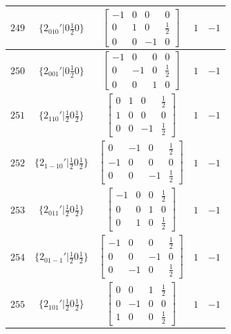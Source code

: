 \documentclass[fleqn,8pt]{jsarticle}
\begin{document}
\begin{longtable}{ccccc}
$ 249 $ & $ \{2{}_{010}{}'|0 \frac{1}{2} 0\} $ & $ \begin{bmatrix} -1 & 0 & 0 & 0 \\ 0 & 1 & 0 & \frac{1}{2} \\ 0 & 0 & -1 & 0 \end{bmatrix} $ & $ 1 $ & $ -1 $ \\ \hline
$ 250 $ & $ \{2{}_{001}{}'|0 \frac{1}{2} 0\} $ & $ \begin{bmatrix} -1 & 0 & 0 & 0 \\ 0 & -1 & 0 & \frac{1}{2} \\ 0 & 0 & 1 & 0 \end{bmatrix} $ & $ 1 $ & $ -1 $ \\ \hline
$ 251 $ & $ \{2{}_{110}{}'|\frac{1}{2} 0 \frac{1}{2}\} $ & $ \begin{bmatrix} 0 & 1 & 0 & \frac{1}{2} \\ 1 & 0 & 0 & 0 \\ 0 & 0 & -1 & \frac{1}{2} \end{bmatrix} $ & $ 1 $ & $ -1 $ \\ \hline
$ 252 $ & $ \{2{}_{1-10}{}'|\frac{1}{2} 0 \frac{1}{2}\} $ & $ \begin{bmatrix} 0 & -1 & 0 & \frac{1}{2} \\ -1 & 0 & 0 & 0 \\ 0 & 0 & -1 & \frac{1}{2} \end{bmatrix} $ & $ 1 $ & $ -1 $ \\ \hline
$ 253 $ & $ \{2{}_{011}{}'|\frac{1}{2} 0 \frac{1}{2}\} $ & $ \begin{bmatrix} -1 & 0 & 0 & \frac{1}{2} \\ 0 & 0 & 1 & 0 \\ 0 & 1 & 0 & \frac{1}{2} \end{bmatrix} $ & $ 1 $ & $ -1 $ \\ \hline
$ 254 $ & $ \{2{}_{01-1}{}'|\frac{1}{2} 0 \frac{1}{2}\} $ & $ \begin{bmatrix} -1 & 0 & 0 & \frac{1}{2} \\ 0 & 0 & -1 & 0 \\ 0 & -1 & 0 & \frac{1}{2} \end{bmatrix} $ & $ 1 $ & $ -1 $ \\ \hline
$ 255 $ & $ \{2{}_{101}{}'|\frac{1}{2} 0 \frac{1}{2}\} $ & $ \begin{bmatrix} 0 & 0 & 1 & \frac{1}{2} \\ 0 & -1 & 0 & 0 \\ 1 & 0 & 0 & \frac{1}{2} \end{bmatrix} $ & $ 1 $ & $ -1 $ \\ \hline

\end{longtable}
\end{document}
